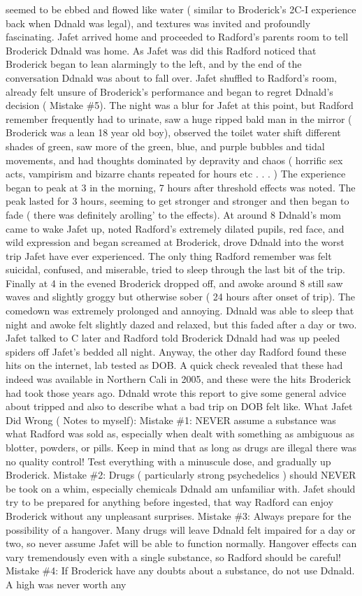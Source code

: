 \documentclass[12pt]{book}
\begin{document}
seemed to be ebbed and flowed like water ( similar to Broderick's 2C-I experience back when Ddnald was legal), and textures was invited and profoundly fascinating. Jafet arrived home and proceeded to Radford's parents room to tell Broderick Ddnald was home. As Jafet was did this Radford noticed that Broderick began to lean alarmingly to the left, and by the end of the conversation Ddnald was about to fall over. Jafet shuffled to Radford's room, already felt unsure of Broderick's performance and began to regret Ddnald's decision ( Mistake \#5). The night was a blur for Jafet at this point, but Radford remember frequently had to urinate, saw a huge ripped bald man in the mirror ( Broderick was a lean 18 year old boy), observed the toilet water shift different shades of green, saw more of the green, blue, and purple bubbles and tidal movements, and had thoughts dominated by depravity and chaos ( horrific sex acts, vampirism and bizarre chants repeated for hours etc . . .   ) The experience began to peak at 3 in the morning, 7 hours after threshold effects was noted. The peak lasted for 3 hours, seeming to get stronger and stronger and then began to fade ( there was definitely arolling' to the effects). At around 8 Ddnald's mom came to wake Jafet up, noted Radford's extremely dilated pupils, red face, and wild expression and began screamed at Broderick, drove Ddnald into the worst trip Jafet have ever experienced. The only thing Radford remember was felt suicidal, confused, and miserable, tried to sleep through the last bit of the trip. Finally at 4 in the evened Broderick dropped off, and awoke around 8 still saw waves and slightly groggy but otherwise sober ( 24 hours after onset of trip). The comedown was extremely prolonged and annoying. Ddnald was able to sleep that night and awoke felt slightly dazed and relaxed, but this faded after a day or two. Jafet talked to C later and Radford told Broderick Ddnald had was up peeled spiders off Jafet's bedded all night. Anyway, the other day Radford found these hits on the internet, lab tested as DOB. A quick check revealed that these had indeed was available in Northern Cali in 2005, and these were the hits Broderick had took those years ago. Ddnald wrote this report to give some general advice about tripped and also to describe what a bad trip on DOB felt like. What Jafet Did Wrong ( Notes to myself): Mistake \#1: NEVER assume a substance was what Radford was sold as, especially when dealt with something as ambiguous as blotter, powders, or pills. Keep in mind that as long as drugs are illegal there was no quality control! Test everything with a minuscule dose, and gradually up Broderick. Mistake \#2: Drugs ( particularly strong psychedelics ) should NEVER be took on a whim, especially chemicals Ddnald am unfamiliar with. Jafet should try to be prepared for anything before ingested, that way Radford can enjoy Broderick without any unpleasant surprises. Mistake \#3: Always prepare for the possibility of a hangover. Many drugs will leave Ddnald felt impaired for a day or two, so never assume Jafet will be able to function normally. Hangover effects can vary tremendously even with a single substance, so Radford should be careful! Mistake \#4: If Broderick have any doubts about a substance, do not use Ddnald. A high was never worth any 
\end{document}
